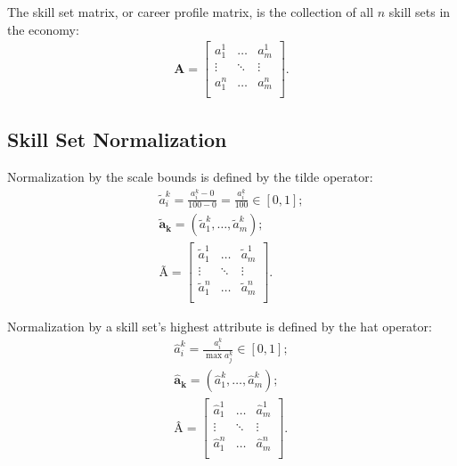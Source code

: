 \documentclass{elsarticle} %
\begin{document}
The skill set matrix, or career profile matrix, is the collection of all $n$
skill sets in the economy:
\begin{gather}
    \textbf{A} =
    \begin{bmatrix}
        a_{1}^{1} & \hdots & a_{m}^{1} \\
        \vdots    & \ddots & \vdots    \\
        a_{1}^{n} & \hdots & a_{m}^{n} \\
    \end{bmatrix}
    .
\end{gather}

\subsection{Skill Set Normalization}
Normalization by the scale bounds is defined by the tilde operator:
\begin{gather}
    \tilde{a}_{i}^{k} =
    \frac{a_{i}^{k} - 0}{100 - 0} =
    \frac{a_{i}^{k}}{100}
    \in [0,1]
    ;\\
    \boldsymbol{\tilde{a}_{k}} =
    (\tilde{a}_{1}^{k}, \dots, \tilde{a}_{m}^{k})
    ;\\
    \textbf{Ã} =
    \begin{bmatrix}
        \tilde{a}_{1}^{1} & \hdots & \tilde{a}_{m}^{1} \\
        \vdots            & \ddots & \vdots            \\
        \tilde{a}_{1}^{n} & \hdots & \tilde{a}_{m}^{n} \\
    \end{bmatrix}
    .
\end{gather}

Normalization by a skill set's highest attribute is defined by the hat
operator:
\begin{gather}
    \hat{a}_{i}^{k} =
    \frac{a_{i}^{k}}{\max{a_{j}^{k}}}
    \in [0,1]
    ;\\
    \boldsymbol{\hat{a}_{k}} =
    (\hat{a}_{1}^{k}, \dots, \hat{a}_{m}^{k})
    ;\\
    \textbf{Â} =
    \begin{bmatrix}
        \hat{a}_{1}^{1} & \hdots & \hat{a}_{m}^{1} \\
        \vdots          & \ddots & \vdots          \\
        \hat{a}_{1}^{n} & \hdots & \hat{a}_{m}^{n} \\
    \end{bmatrix}
    .
\end{gather}
\end{document}

